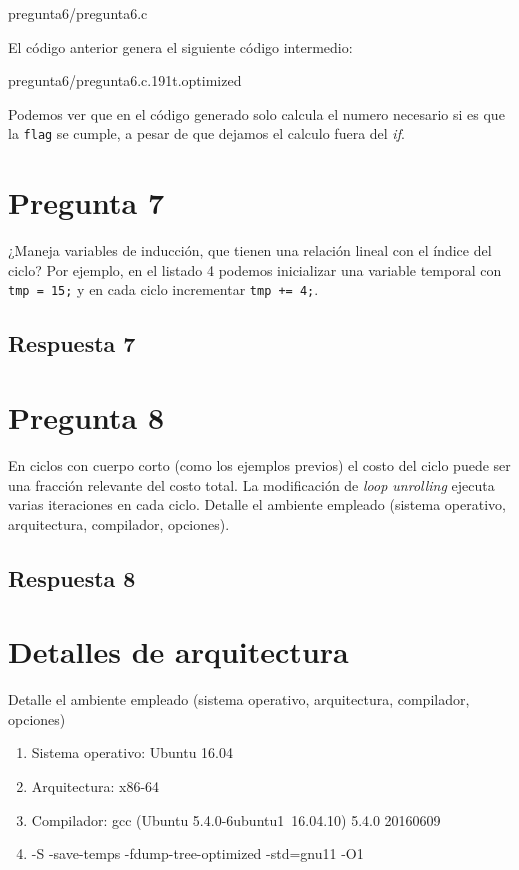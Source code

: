 \documentclass[spanish, fleqn]{article}
\begin{document}
 {pregunta6/pregunta6.c}

El código anterior genera el siguiente código intermedio:

 {pregunta6/pregunta6.c.191t.optimized}
    
Podemos ver que en el código generado solo calcula el numero necesario si es que la \texttt{flag} se cumple, a pesar de que dejamos el calculo fuera del \textit{if}.

\section{Pregunta 7}

¿Maneja variables de inducción, que tienen una relación lineal con el índice del ciclo? Por ejemplo, en el listado 4 podemos inicializar una variable temporal con \texttt{tmp = 15;} y en cada ciclo incrementar \texttt{tmp += 4;}.

\subsection{Respuesta 7}

\section{Pregunta 8}

En ciclos con cuerpo corto (como los ejemplos previos) el costo del ciclo puede ser una fracción relevante del costo total. La modificación de \textit{loop unrolling} ejecuta varias iteraciones en cada ciclo. Detalle el ambiente empleado (sistema operativo, arquitectura, compilador, opciones).

\subsection{Respuesta 8}



\section{Detalles de arquitectura}

Detalle el ambiente empleado (sistema operativo, arquitectura, compilador, opciones)

\begin{enumerate}
    \item Sistema operativo: Ubuntu 16.04
    \item Arquitectura: x86-64
    \item Compilador: gcc (Ubuntu 5.4.0-6ubuntu1~16.04.10) 5.4.0 20160609
    \item -S -save-temps -fdump-tree-optimized -std=gnu11 -O1

    
\end{enumerate}
\end{document}
